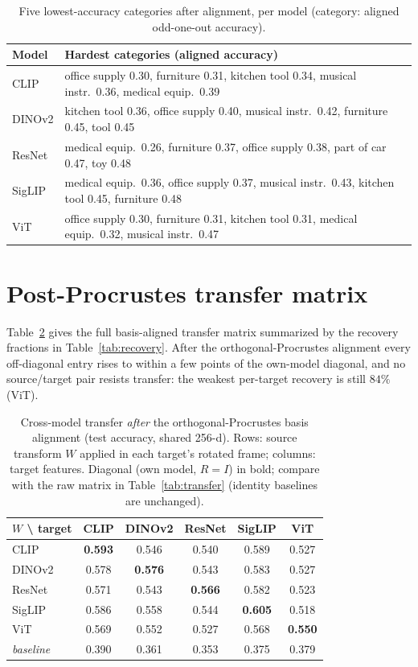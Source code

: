 \documentclass{article}
\begin{document}
\begin{table}[h]
\centering
\caption{Five lowest-accuracy categories after alignment, per model
(category: aligned odd-one-out accuracy).}
\label{tab:cats}
\small
\begin{tabular}{ll}
\toprule
Model & Hardest categories (aligned accuracy) \\
\midrule
CLIP    & office supply 0.30, furniture 0.31, kitchen tool 0.34, musical instr.\ 0.36, medical equip.\ 0.39 \\
DINOv2  & kitchen tool 0.36, office supply 0.40, musical instr.\ 0.42, furniture 0.45, tool 0.45 \\
ResNet  & medical equip.\ 0.26, furniture 0.37, office supply 0.38, part of car 0.47, toy 0.48 \\
SigLIP  & medical equip.\ 0.36, office supply 0.37, musical instr.\ 0.43, kitchen tool 0.45, furniture 0.48 \\
ViT     & office supply 0.30, furniture 0.31, kitchen tool 0.31, medical equip.\ 0.32, musical instr.\ 0.47 \\
\bottomrule
\end{tabular}
\end{table}

\section{Post-Procrustes transfer matrix}\label{app:transfer-aligned}
Table~\ref{tab:transfer-aligned} gives the full basis-aligned transfer matrix
summarized by the recovery fractions in Table~\ref{tab:recovery}. After the
orthogonal-Procrustes alignment every off-diagonal entry rises to within a few points
of the own-model diagonal, and no source/target pair resists transfer: the weakest
per-target recovery is still $84\%$ (ViT).

\begin{table}[h]
\centering
\caption{Cross-model transfer \emph{after} the orthogonal-Procrustes basis alignment
(test accuracy, shared 256-d). Rows: source transform $W$ applied in each target's
rotated frame; columns: target features. Diagonal (own model, $R{=}I$) in bold; compare
with the raw matrix in Table~\ref{tab:transfer} (identity baselines are unchanged).}
\label{tab:transfer-aligned}
\begin{tabular}{lccccc}
\toprule
$W$ \textbackslash{} target & CLIP & DINOv2 & ResNet & SigLIP & ViT \\
\midrule
CLIP    & \textbf{0.593} & 0.546 & 0.540 & 0.589 & 0.527 \\
DINOv2  & 0.578 & \textbf{0.576} & 0.543 & 0.583 & 0.527 \\
ResNet  & 0.571 & 0.543 & \textbf{0.566} & 0.582 & 0.523 \\
SigLIP  & 0.586 & 0.558 & 0.544 & \textbf{0.605} & 0.518 \\
ViT     & 0.569 & 0.552 & 0.527 & 0.568 & \textbf{0.550} \\
\midrule
\textit{baseline} & 0.390 & 0.361 & 0.353 & 0.375 & 0.379 \\
\bottomrule
\end{tabular}
\end{table}
\end{document}
